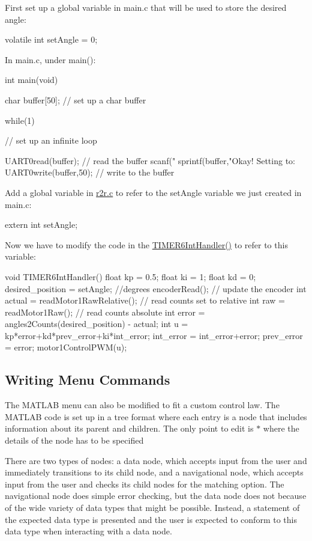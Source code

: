 First set up a global variable in {\ttfamily main.\+c} that will be used to store the desired angle\+: \begin{DoxyVerb}volatile int setAngle = 0;
\end{DoxyVerb}


In {\ttfamily main.\+c}, under {\ttfamily main()}\+: \begin{DoxyVerb}    int main(void){
    char buffer[50]; // set up a char buffer

    while(1){ // set up an infinite loop

        UART0read(buffer); // read the buffer
        scanf("%
        sprintf(buffer,"Okay! Setting to: %
        UART0write(buffer,50); // write to the buffer

    }   
}
\end{DoxyVerb}


Add a global variable in {\ttfamily \mbox{\hyperlink{r2r_8c}{r2r.\+c}}} to refer to the set\+Angle variable we just created in main.\+c\+: \begin{DoxyVerb}    extern int setAngle;
\end{DoxyVerb}


Now we have to modify the code in the {\ttfamily \mbox{\hyperlink{r2r_8c_a57b21594b75d4b2a140a1f9bbb1465e8}{T\+I\+M\+E\+R6\+Int\+Handler()}}} to refer to this variable\+: \begin{DoxyVerb}void TIMER6IntHandler(){
    float kp = 0.5;
    float ki = 1;
    float kd = 0;
    desired_position = setAngle; //degrees
    encoderRead(); // update the encoder
    int actual = readMotor1RawRelative(); // read counts set to relative
    int raw = readMotor1Raw(); // read counts absolute
    int error = angles2Counts(desired_position) - actual;
    int u = kp*error+kd*prev_error+ki*int_error;
     int_error = int_error+error;
     prev_error = error;
    motor1ControlPWM(u);
 }  
\end{DoxyVerb}
\hypertarget{index_menu}{}\subsection{Writing Menu Commands}\label{index_menu}
The M\+A\+T\+L\+AB menu can also be modified to fit a custom control law. The M\+A\+T\+L\+AB code is set up in a tree format where each entry is a node that includes information about its parent and children. The only point to edit is $\ast$ where the details of the node has to be specified

There are two types of nodes\+: a data node, which accepts input from the user and immediately transitions to its child node, and a navigational node, which accepts input from the user and checks its child nodes for the matching option. The navigational node does simple error checking, but the data node does not because of the wide variety of data types that might be possible. Instead, a statement of the expected data type is presented and the user is expected to conform to this data type when interacting with a data node.

